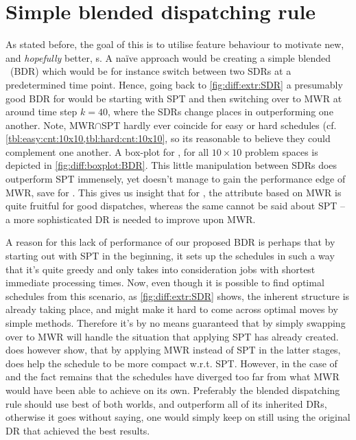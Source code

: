 \section{Simple blended dispatching rule}\label{sec:diff:opt:bdr}
As stated before, the goal of this  is to 
utilise feature behaviour to motivate new, and \emph{hopefully} better, 
\dr s. 
A na\"ive approach would be creating a simple blended \dr\ (BDR) which 
would be for instance switch between two SDRs at a predetermined time point. 
Hence, going back to \cref{fig:diff:extr:SDR} a presumably good BDR for 
  would be starting with SPT and then switching over to MWR at 
around time step $k=40$, where the SDRs change places in outperforming one 
another. 
Note, MWR$\cap$SPT hardly ever coincide for easy or hard schedules (cf. 
\cref{tbl:easy:cnt:10x10,tbl:hard:cnt:10x10}, so its reasonable to believe they 
could complement one another.
A box-plot for \namerho, for all $10\times10$ problem spaces is 
depicted in \cref{fig:diff:boxplot:BDR}. This little manipulation between SDRs 
does outperform SPT immensely, yet doesn't manage to gain the performance edge 
of MWR, save for . This gives us insight that for \jsp, the 
attribute based on MWR is quite fruitful for good dispatches, whereas the same 
cannot be said about SPT -- a more sophisticated DR is needed to improve upon 
MWR. 

A reason for this lack of performance of our proposed BDR is perhaps that by 
starting out with SPT in the beginning, it sets up the schedules in such a way 
that it's quite greedy and only takes into consideration jobs with shortest 
immediate processing times. Now, even though it is possible to find optimal 
schedules from this scenario, as \cref{fig:diff:extr:SDR} shows, the inherent 
structure is already taking place, and might make it hard to come across 
optimal moves by simple methods. Therefore it's by no means guaranteed that by 
simply swapping over to MWR will handle the situation that applying SPT has 
already created.  does however show, that by 
applying MWR instead of SPT in the latter stages, does help the schedule to be 
more compact w.r.t. SPT. However, in the case of  and 
 the fact remains that the schedules have diverged too far from 
what MWR would have been able to achieve on its own. Preferably the blended 
dispatching rule should use  best of both worlds, and outperform all of its 
inherited DRs, otherwise it goes without saying, one would simply keep on still 
using the original DR that achieved the best results.

